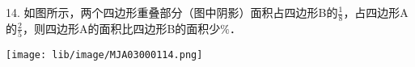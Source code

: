 14. 如图所示，两个四边形重叠部分（图中阴影）面积占四边形B的$\frac{1}{8}$，占四边形A的$\frac{2}{5}$，则四边形A的面积比四边形B的面积少\key{\hspace{1cm}}$\%$．

\begin{center}

    \texttt{[image: lib/image/MJA03000114.png]}

\end{center}



